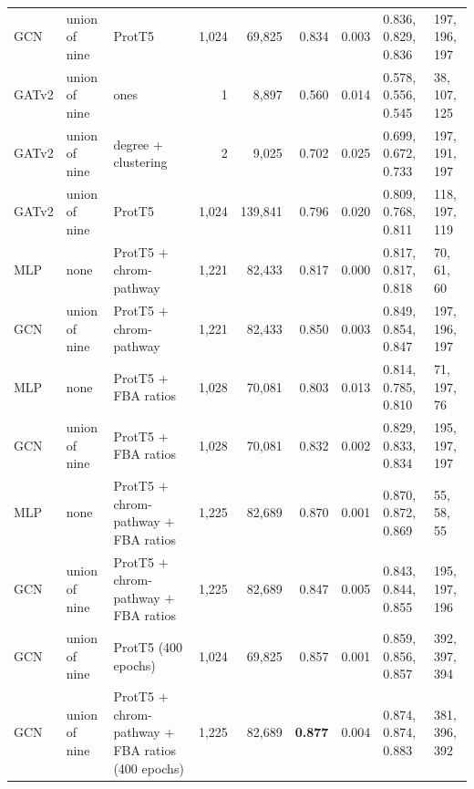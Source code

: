 \begin{table}[H]
\begin{tabular}{@{}lllrrrrll@{}}
    GCN & union of nine & ProtT5 & 1,024 & 69,825 & 0.834 & 0.003 & 0.836, 0.829, 0.836 & 197, 196, 197 \\
    GATv2 & union of nine & ones & 1 & 8,897 & 0.560 & 0.014 & 0.578, 0.556, 0.545 & 38, 107, 125 \\
    GATv2 & union of nine & degree $+$ clustering & 2 & 9,025 & 0.702 & 0.025 & 0.699, 0.672, 0.733 & 197, 191, 197 \\
    GATv2 & union of nine & ProtT5 & 1,024 & 139,841 & 0.796 & 0.020 & 0.809, 0.768, 0.811 & 118, 197, 119 \\
    MLP & none & ProtT5 $+$ chrom-pathway & 1,221 & 82,433 & 0.817 & 0.000 & 0.817, 0.817, 0.818 & 70, 61, 60 \\
    GCN & union of nine & ProtT5 $+$ chrom-pathway & 1,221 & 82,433 & 0.850 & 0.003 & 0.849, 0.854, 0.847 & 197, 196, 197 \\
    MLP & none & ProtT5 $+$ FBA ratios & 1,028 & 70,081 & 0.803 & 0.013 & 0.814, 0.785, 0.810 & 71, 197, 76 \\
    GCN & union of nine & ProtT5 $+$ FBA ratios & 1,028 & 70,081 & 0.832 & 0.002 & 0.829, 0.833, 0.834 & 195, 197, 197 \\
    MLP & none & ProtT5 $+$ chrom-pathway $+$ FBA ratios & 1,225 & 82,689 & 0.870 & 0.001 & 0.870, 0.872, 0.869 & 55, 58, 55 \\
    GCN & union of nine & ProtT5 $+$ chrom-pathway $+$ FBA ratios & 1,225 & 82,689 & 0.847 & 0.005 & 0.843, 0.844, 0.855 & 195, 197, 196 \\
    GCN & union of nine & ProtT5 (400 epochs) & 1,024 & 69,825 & 0.857 & 0.001 & 0.859, 0.856, 0.857 & 392, 397, 394 \\
    GCN & union of nine & ProtT5 $+$ chrom-pathway $+$ FBA ratios (400 epochs) & 1,225 & 82,689 & \textbf{0.877} & 0.004 & 0.874, 0.874, 0.883 & 381, 396, 392 \\
    \hline
  \end{tabular}
\end{table}
